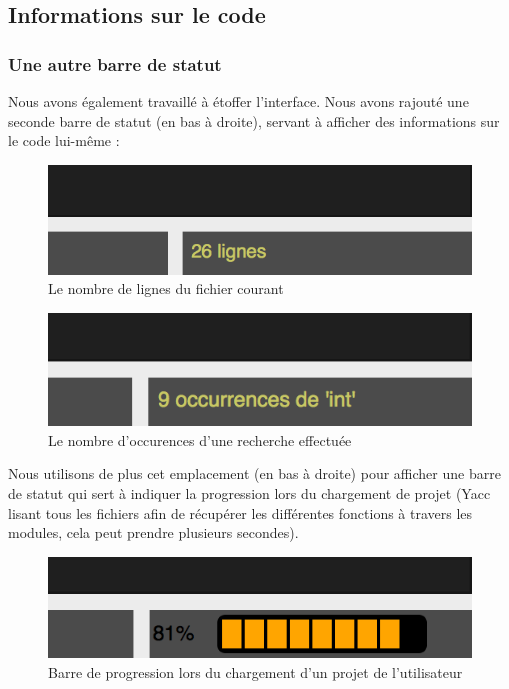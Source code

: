 \documentclass[a4paper,12pt]{article}
\begin{document}
	\subsection{Informations sur le code}

		\subsubsection{Une autre barre de statut}
	
		Nous avons également travaillé à étoffer l'interface. Nous avons rajouté une seconde barre de statut (en bas à droite), servant à afficher des informations sur le code lui-même :
		
		\begin{figure}[h!]
			\begin{center}
				\includegraphics[scale=1]{images/imgs_themes/nb_lignes}
				\caption{Le nombre de lignes du fichier courant}
			\end{center}
		\end{figure}
		\begin{figure}[h!]
			\begin{center}
				\includegraphics[scale=1]{images/imgs_themes/nb_occu}
				\caption{Le nombre d'occurences d'une recherche effectuée}
			\end{center}
		\end{figure}
		
		Nous utilisons de plus cet emplacement (en bas à droite) pour afficher une barre de statut qui sert à indiquer la progression lors du chargement de projet (Yacc lisant tous les fichiers afin de récupérer les différentes fonctions à travers les modules, cela peut prendre plusieurs secondes).
		\begin{figure}[h!]
			\begin{center}
				\includegraphics[scale=1]{images/imgs_themes/progress}
				\caption{Barre de progression lors du chargement d'un projet de l'utilisateur}
			\end{center}
		\end{figure}
		
\end{document}
